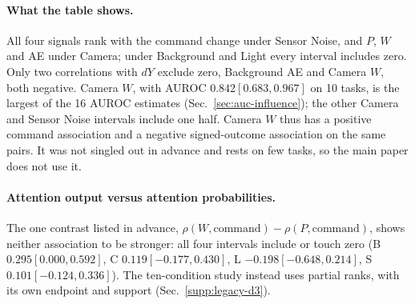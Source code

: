 \paragraph{What the table shows.}
All four signals rank with the command change under Sensor Noise, and $P$, $W$ and AE under Camera; under Background and Light every interval includes zero. Only two correlations with $dY$ exclude zero, Background AE and Camera $W$, both negative. Camera $W$, with AUROC $0.842[0.683,0.967]$ on 10 tasks, is the largest of the 16 AUROC estimates (Sec.~\ref{sec:auc-influence}); the other Camera and Sensor Noise intervals include one half. Camera $W$ thus has a positive command association and a negative signed-outcome association on the same pairs. It was not singled out in advance and rests on few tasks, so the main paper does not use it.

\paragraph{Attention output versus attention probabilities.}
The one contrast listed in advance, $\rho(W,\mathrm{command})-\rho(P,\mathrm{command})$, shows neither association to be stronger: all four intervals include or touch zero (B $0.295[0.000,0.592]$, C $0.119[-0.177,0.430]$, L $-0.198[-0.648,0.214]$, S $0.101[-0.124,0.336]$). The ten-condition study instead uses partial ranks, with its own endpoint and support (Sec.~\ref{supp:legacy-d3}).

\clearpage
